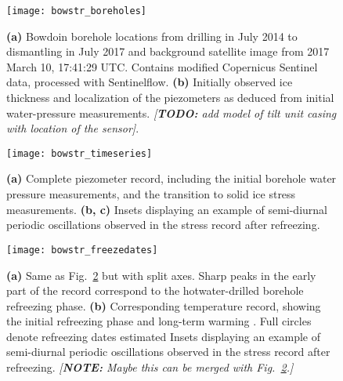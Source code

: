 \documentclass[utf8]{article}
\newcommand{\note}[1]{\textcolor{c0}{\emph{[\textbf{NOTE:} #1]}}}
\newcommand{\todo}[1]{\textcolor{c3}{\emph{[\textbf{TODO:} #1]}}}
\begin{document}






    \begin{figure}
      \centerline{\texttt{[image: bowstr\_boreholes]}}
      \caption{%
        \textbf{(a)}
          Bowdoin borehole locations from drilling in July 2014 to dismantling
          in July 2017 and background satellite image from 2017 March 10,
          17:41:29 UTC. Contains modified Copernicus Sentinel data, processed
          with Sentinelflow.
        \textbf{(b)}
          Initially observed ice thickness and localization of the piezometers
          as deduced from initial water-pressure measurements.
        \todo{add model of tilt unit casing with location of the sensor}.}
      \label{fig:boreholes}
    \end{figure}

    \begin{figure}
      \centerline{\texttt{[image: bowstr\_timeseries]}}
      \caption{%
        \textbf{(a)}
          Complete piezometer record, including the initial borehole water
          pressure measurements, and the transition to solid ice stress
          measurements.
        \textbf{(b, c)}
          Insets displaying an example of semi-diurnal periodic oscillations
          observed in the stress record after refreezing.}
      \label{fig:timeseries}
    \end{figure}

    \begin{figure}
      \centerline{\texttt{[image: bowstr\_freezedates]}}
      \caption{%
        \textbf{(a)}
          Same as Fig.~\ref{fig:timeseries} but with split axes. Sharp peaks in
          the early part of the record correspond to the hotwater-drilled
          borehole refreezing phase.
        \textbf{(b)}
          Corresponding temperature record, showing the initial refreezing
          phase and long-term warming \citep[cf.][]{Seguinot.etal.2020}.
          Full circles denote refreezing dates estimated
          Insets displaying an example of semi-diurnal periodic oscillations
          observed in the stress record after refreezing.
        \note{%
          Maybe this can be merged with Fig.~\ref{fig:timeseries}.}}
      \label{fig:freezedates}
    \end{figure}
\end{document}
